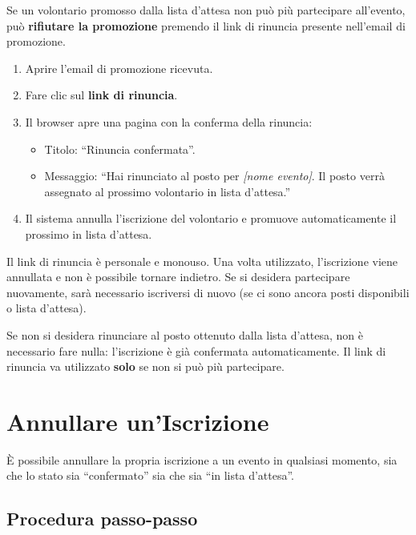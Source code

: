 \documentclass[a4paper,11pt,oneside]{book}
\begin{document}
Se un volontario promosso dalla lista d'attesa non pu\`o pi\`u partecipare all'evento, pu\`o \textbf{rifiutare la promozione} premendo il link di rinuncia presente nell'email di promozione.

\begin{enumerate}[leftmargin=1.5em]
  \item Aprire l'email di promozione ricevuta.
  \item Fare clic sul \textbf{link di rinuncia}.
  \item Il browser apre una pagina con la conferma della rinuncia:
    \begin{itemize}
      \item Titolo: ``Rinuncia confermata''.
      \item Messaggio: ``Hai rinunciato al posto per \textit{[nome evento]}. Il posto verr\`a assegnato al prossimo volontario in lista d'attesa.''
    \end{itemize}
  \item Il sistema annulla l'iscrizione del volontario e promuove automaticamente il prossimo in lista d'attesa.
\end{enumerate}

\begin{warningbox}
Il link di rinuncia \`e personale e monouso. Una volta utilizzato, l'iscrizione viene annullata e non \`e possibile tornare indietro. Se si desidera partecipare nuovamente, sar\`a necessario iscriversi di nuovo (se ci sono ancora posti disponibili o lista d'attesa).
\end{warningbox}

\begin{tipbox}
Se non si desidera rinunciare al posto ottenuto dalla lista d'attesa, non \`e necessario fare nulla: l'iscrizione \`e gi\`a confermata automaticamente. Il link di rinuncia va utilizzato \textbf{solo} se non si pu\`o pi\`u partecipare.
\end{tipbox}

\section{Annullare un'Iscrizione}
\label{sec:annullamento-iscrizione}

\`E possibile annullare la propria iscrizione a un evento in qualsiasi momento, sia che lo stato sia ``confermato'' sia che sia ``in lista d'attesa''.

\subsection{Procedura passo-passo}
\end{document}
